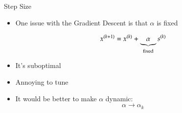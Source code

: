 \documentclass[10pt]{beamer}
\begin{document}

\begin{frame}{Step Size}
        \begin{itemize}

\item One issue with the Gradient Descent is that $\alpha$ is fixed 

$$ x^{(k+1)} = x^{(k)} + \underbrace{\alpha}_{\footnotesize \text{fixed} } s^{(k)} $$
\vfill 
\item It's suboptimal

\vfill 
\item Annoying to tune

\vfill 
\item It would be better to make $\alpha$ dynamic: 
$$
    \alpha \rightarrow \alpha_k
$$
\vfill 
\end{itemize}
\end{frame}




\end{document}
